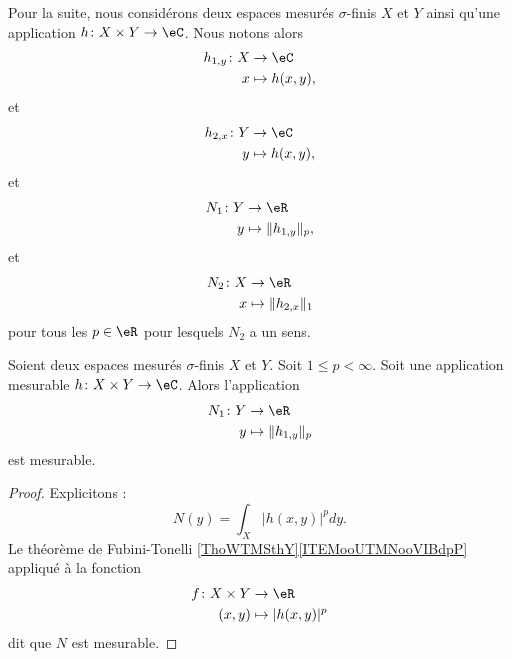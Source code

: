 \begin{normaltext}
	Pour la suite, nous considérons deux espaces mesurés \( \sigma\)-finis \( X\) et \( Y\) ainsi qu'une application \(h \colon X\times Y\to \eC  \). Nous notons alors
	\begin{equation}
		\begin{aligned}
			h_{1,y}\colon X & \to \eC         \\
			x               & \mapsto h(x,y),
		\end{aligned}
	\end{equation}
	et
	\begin{equation}
		\begin{aligned}
			h_{2,x}\colon Y & \to \eC         \\
			y               & \mapsto h(x,y),
		\end{aligned}
	\end{equation}
	et
	\begin{equation}
		\begin{aligned}
			N_1\colon Y & \to \eR                  \\
			y           & \mapsto \| h_{1,y} \|_p,
		\end{aligned}
	\end{equation}
	et
	\begin{equation}
		\begin{aligned}
			N_2\colon X & \to \eR                 \\
			x           & \mapsto \| h_{2,x} \|_1
		\end{aligned}
	\end{equation}
	pour tous les \( p\in \eR\) pour lesquels \( N_2\) a un sens.
\end{normaltext}

\begin{proposition}	\label{PROPooUMSFooJWFJzt}
	Soient deux espaces mesurés \( \sigma\)-finis \( X\) et \( Y\). Soit \( 1\leq p< \infty\). Soit une application mesurable \(h \colon X\times Y\to \eC  \). Alors l'application
	\begin{equation}
		\begin{aligned}
			N_1\colon Y & \to \eR                 \\
			y           & \mapsto \| h_{1,y} \|_p
		\end{aligned}
	\end{equation}
	est mesurable.
\end{proposition}

\begin{proof}
	Explicitons :
	\begin{equation}
		N(y)=\int_X| h(x,y) |^pdy.
	\end{equation}
	Le théorème de Fubini-Tonelli \ref{ThoWTMSthY}\ref{ITEMooUTMNooVIBdpP} appliqué à la fonction
	\begin{equation}
		\begin{aligned}
			f\colon X\times Y & \to \eR              \\
			(x,y)             & \mapsto | h(x,y) |^p
		\end{aligned}
	\end{equation}
	dit que \( N\) est mesurable.
\end{proof}

